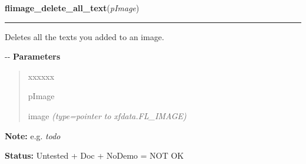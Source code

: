     \vspace{0.5ex}

\hspace{.8\funcindent}\begin{boxedminipage}{\funcwidth}

    \raggedright \textbf{flimage\_delete\_all\_text}(\textit{pImage})

    \vspace{-1.5ex}

    \rule{\textwidth}{0.5\fboxrule}
\setlength{\parskip}{2ex}

Deletes all the texts you added to an image.

-{}-
\setlength{\parskip}{1ex}
      \textbf{Parameters}
      \vspace{-1ex}

      \begin{quote}
        \begin{Ventry}{xxxxxx}

          \item[pImage]


image
            {\it (type=pointer to xfdata.FL\_IMAGE)}

        \end{Ventry}

      \end{quote}

\textbf{Note:} 
e.g. \emph{todo}


\textbf{Status:} 
Untested + Doc + NoDemo = NOT OK


    \end{boxedminipage}

    \label{xformslib:flflimage:flimage_add_marker}

    \vspace{0.5ex}

